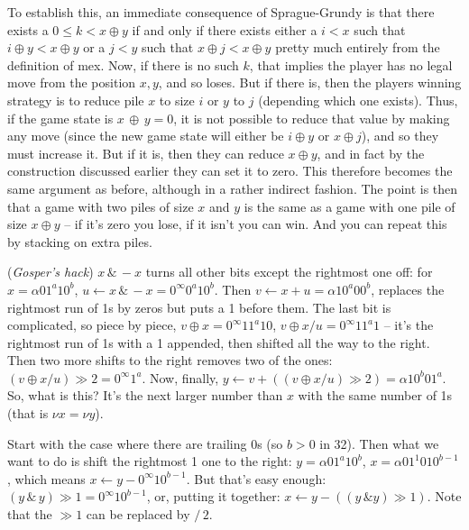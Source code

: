 To establish this, an immediate consequence of Sprague-Grundy is that
there exists a $0 \le k < x \oplus y$ if and only if there exists
either a $i < x$ such that $i \oplus y < x \oplus y$ or
a $j < y$ such that $x \oplus j < x \oplus y$ pretty much entirely from
the definition of mex.  Now, if there is no such $k$, that implies the
player has no legal move from the position $x, y$, and so loses.
But if there is, then the players winning strategy is to reduce pile $x$ to
size $i$ or $y$ to $j$ (depending which one exists).  Thus, if the game state is $x \, \oplus \, y = 0$, it is not possible to reduce that
value by making any move (since the new game state will either be 
$i \oplus y$ or $x \oplus j$), and so they must increase it.  But if it
is, then they can reduce $x \oplus y$, and in fact by the construction
discussed earlier they can set it to zero.  This therefore becomes the
same argument as before, although in a rather indirect fashion.
The point is then that a game with two piles of size $x$ and $y$ is
the same as a game with one pile of size $x \oplus y$ -- if it's zero
you lose, if it isn't you can win.  And you can repeat this by stacking
on extra piles.

\vskip 0.08in  ({\it Gosper's hack})\hfil\break
$x \, \& \, -x$ turns all other bits except the rightmost one off: for
$x = \alpha 0 1^a 1 0^b$, $u \gets x \, \& \, -x = 0^{\infty} 0^a 1 0^b$.
Then $v \gets x + u = \alpha 1 0^a 0 0^b$, replaces the rightmost
run of 1s by zeros but puts a 1 before them.  The last bit is complicated, so
piece by piece, $v \oplus x = 0^{\infty} 1 1^a 1 0$,
$v \oplus x / u = 0^{\infty} 1 1^a 1$ -- it's the rightmost run of 1s with a 1 appended,
then shifted all the way to the right.  Then two more shifts to the right removes
two of the ones: $\left(v \oplus x / u\right) \gg 2 = 0^{\infty} 1^a$.
Now, finally, $y \gets v + \left( \left(v \oplus x / u\right) \gg 2 \right)
= \alpha 1 0^{b} 0 1^a$.  So, what is this?  It's the next larger number than $x$
with the same number of 1s (that is $\nu x = \nu y$).

\vskip 0.08in  Start with the case where 
there are trailing 0s (so $b > 0$ in 32).  Then what we want to
do is shift the rightmost 1 one to the right: $y = \alpha 0 1^a 1 0^b$,
$x = \alpha 0 1^1 0 1 0^{b-1}$, which means $x \gets y -  0^{\infty} 1 0^{b-1}$.
But that's easy enough: $\left(y \, \& \,y\right) \gg 1 = 0^{\infty} 1 0^{b-1}$,
or, putting it together: $x \gets y - \left( \left(y \,\& y\right)  \gg 1 \right)$.
Note that the $\gg 1$ can be replaced by $ / \,2$.

